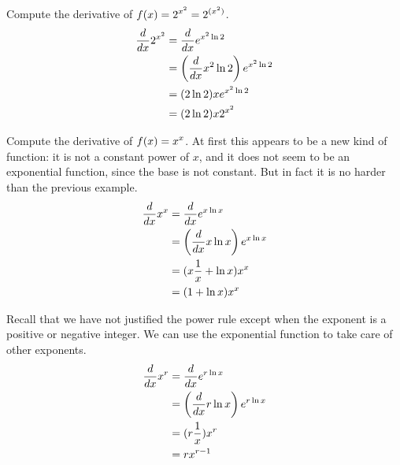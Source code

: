 \begin{example}
Compute the derivative of $\displaystyle f(x)=2^{x^2}=2^{(x^2)}$.
\begin{align*}
{d\over dx}2^{x^2} &= {d\over dx}e^{x^2\ln 2} \\
&= \left({d\over dx} x^2\ln 2\right) e^{x^2\ln 2} \\
&= (2\ln 2) x  e^{x^2\ln 2} \\
&=  (2\ln 2) x 2^{x^2} \\
\end{align*}
\vskip-10pt
\end{example}

\begin{example}
Compute the derivative of $\displaystyle f(x)=x^x$. At first this appears to be a
new kind of function: it is not a constant power of $x$, and it does
not seem to be an exponential function, since the base is not
constant. But in fact it is no harder than the previous example.
\begin{align*}
{d\over dx}x^x&={d\over dx}e^{x\ln x} \\
&=\left({d\over dx}x\ln x\right)e^{x\ln x} \\
&=(x{1\over x}+\ln x)x^x \\
&=(1+\ln x)x^x \\
\end{align*}
\vskip-10pt
\end{example}

\begin{example} Recall that we have not justified the power
rule except when the exponent is a positive or negative integer. We
can use the exponential function to take care of other exponents.
\begin{align*}
{d\over dx}x^r&={d\over dx}e^{r\ln x} \\
&=\left({d\over dx}r\ln x\right)e^{r\ln x} \\
&=(r{1\over x})x^r \\
&=rx^{r-1} \\
\end{align*}
\vskip-10pt
\end{example}

